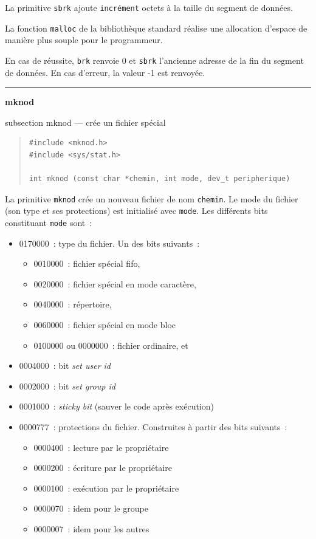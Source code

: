 \documentclass [twoside] {report}
\newcommand {\primitive} [1]
    {
	\phantomsection
	{\large \textbf {#1}}
	\addcontentsline {toc} {subsection} {#1}
    }
\newcommand {\separation}
    {
	\vspace {5mm}
	\nopagebreak
	\hrule
    }
\begin{document}
La primitive \texttt {sbrk} ajoute \texttt {incrément} octets à la taille du
segment de données.

La fonction \texttt {malloc} de la bibliothèque standard réalise une allocation
d'espace de manière plus souple pour le programmeur.

En cas de réussite, \texttt {brk} renvoie 0 et \texttt {sbrk} l'ancienne adresse
de la fin du segment de données.  En cas d'erreur, la valeur -1 est
renvoyée.




\separation
\primitive {mknod} --- crée un fichier spécial

\begin {quote}
\begin {verbatim}
#include <mknod.h>
#include <sys/stat.h>

int mknod (const char *chemin, int mode, dev_t peripherique)
\end{verbatim}
\end {quote}

La primitive \texttt {mknod} crée un nouveau fichier de
nom \texttt {chemin}. Le mode du fichier (son type et ses
protections) est initialisé avec \texttt {mode}. Les
différents bits constituant \texttt {mode} sont~:

\begin {itemize}
    \item 0170000~: type du fichier. Un des bits suivants~:
	\begin {itemize}
	    \item 0010000~: fichier spécial fifo,
	    \item 0020000~: fichier spécial en mode caractère,
	    \item 0040000~: répertoire,
	    \item 0060000~: fichier spécial en mode bloc
	    \item 0100000 ou 0000000~: fichier ordinaire, et
	\end {itemize}
    \item 0004000~: bit \textit {set user id}
    \item 0002000~: bit \textit {set group id}
    \item 0001000~: \textit {sticky bit} (sauver le code après exécution)
    \item 0000777~: protections du fichier. Construites
	à partir des bits suivants~:
	\begin {itemize}
	    \item 0000400~: lecture par le propriétaire
	    \item 0000200~: écriture par le propriétaire
	    \item 0000100~: exécution par le propriétaire
	    \item 0000070~: idem pour le groupe
	    \item 0000007~: idem pour les autres
	\end {itemize}
\end {itemize}
\end{document}
